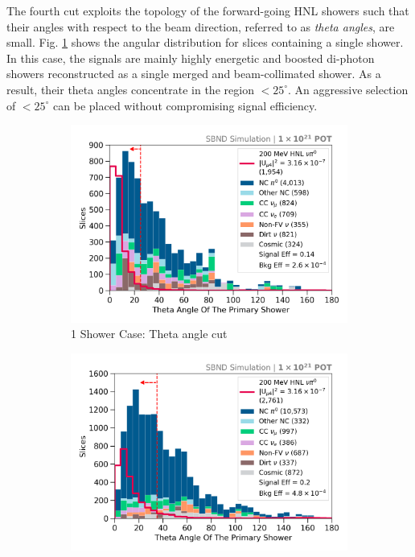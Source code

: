 The fourth cut exploits the topology of the forward-going HNL showers such that their angles with respect to the beam direction, referred to as \textit{theta angles}, are small.
Fig. \ref{fig:1shw_theta_cut} shows the angular distribution for slices containing a single shower.
In this case, the signals are mainly highly energetic and boosted di-photon showers reconstructed as a single merged and beam-collimated shower.
As a result, their theta angles concentrate in the region $< 25^{\circ}$.
An aggressive selection of $< 25^{\circ}$ can be placed without compromising signal efficiency.
\begin{figure}[bp!]
        \begin{subfigure}[b]{0.495\textwidth}   
            \centering 
            \includegraphics[width=\textwidth]{one_shower_theta_precut}
            \caption{1 Shower Case: Theta angle cut}%
	    \label{fig:1shw_theta_cut}
        \end{subfigure}
        \hfill
        \begin{subfigure}[b]{0.495\textwidth}   
            \centering 
            \includegraphics[width=\textwidth]{two_shower_primary_theta_precut}

\end{subfigure}
\end{figure}
